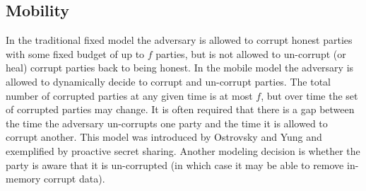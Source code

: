 \subsection{Mobility}
In the traditional fixed model the adversary is allowed to corrupt honest parties with 
some fixed budget of up to $f$ parties, but is not allowed to un-corrupt (or heal) 
corrupt parties back to being honest. 
In the mobile model the adversary is allowed to dynamically decide to 
corrupt and un-corrupt parties. 
The total number of corrupted parties at any given time is at most $f$, 
but over time the set of corrupted parties may change. 
It is often required that there is a gap between the time the adversary un-corrupts one party and 
the time it is allowed to corrupt another. 
This model was introduced by Ostrovsky and Yung and exemplified by proactive secret sharing. 
Another modeling decision is whether the party is aware that it is un-corrupted (in which case it may 
be able to remove in-memory corrupt data).




    




